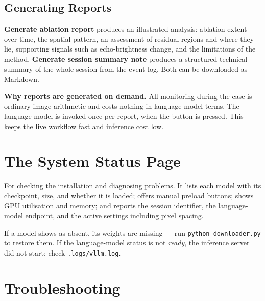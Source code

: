 \documentclass[11pt,a4paper]{article}
\newcommand{\ui}[1]{\textbf{#1}}
\newcommand{\code}[1]{\texttt{\small #1}}
\begin{document}
\subsection{Generating Reports}

\ui{Generate ablation report} produces an illustrated analysis: ablation
extent over time, the spatial pattern, an assessment of residual regions and
where they lie, supporting signals such as echo-brightness change, and the
limitations of the method. \ui{Generate session summary note} produces a
structured technical summary of the whole session from the event log. Both
can be downloaded as Markdown.

\begin{tipbox}
\textbf{Why reports are generated on demand.} All monitoring during the case
is ordinary image arithmetic and costs nothing in language-model terms. The
language model is invoked once per report, when the button is pressed. This
keeps the live workflow fast and inference cost low.
\end{tipbox}

\section{The System Status Page}

For checking the installation and diagnosing problems. It lists each model
with its checkpoint, size, and whether it is loaded; offers manual preload
buttons; shows GPU utilisation and memory; and reports the session
identifier, the language-model endpoint, and the active settings including
pixel spacing.

If a model shows as absent, its weights are missing --- run
\code{python downloader.py} to restore them. If the language-model status is
not \emph{ready}, the inference server did not start; check
\code{.logs/vllm.log}.

\section{Troubleshooting}
\end{document}
